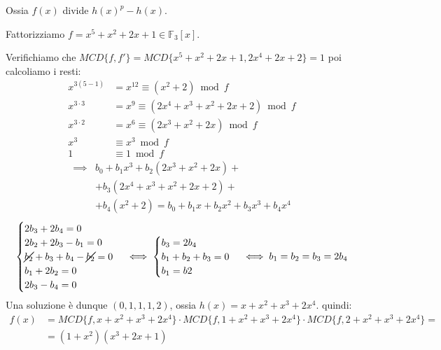 \documentclass[../main.tex]{subfiles}
\begin{document}
Ossia $f(x)$ divide $h(x)^p - h(x)$.
\begin{example}
    Fattorizziamo $f = x^5 + x^2 + 2x + 1 \in \mathbb{F}_3[x]$.

    Verifichiamo che $MCD\{f, f'\} = MCD\{ x^5 + x^2 + 2x + 1, 2x^4 + 2x + 2\} = 1$ poi calcoliamo i resti:
    \begin{align*}
        x^{3(5-1)}    & = x^{12} \equiv (x^2 + 2) \bmod f                \\
        x^{3\cdot3}   & = x^9 \equiv (2x^4 + x^3 + x^2 + 2x + 2) \bmod f \\
        x^{3 \cdot 2} & = x^6 \equiv (2x^3 + x^2 + 2x) \bmod f           \\
        x^3           & \equiv x^3 \bmod f                               \\
        1             & \equiv 1 \bmod f
    \end{align*}
    \begin{align*}
        \implies & b_0 + b_1 x^3 + b_2(2x^3 + x^2 + 2x) +                    \\
                 & + b_3 (2x^4 + x^3 + x^2 + 2x + 2) +                       \\
                 & + b_4(x^2 + 2) = b_0 + b_1 x + b_2x^2 + b_3 x^3 + b_4 x^4
    \end{align*}
    \begin{equation*}
        \begin{cases}
            2 b_3 + 2 b_4 = 0                           \\
            2 b_2 + 2 b_3 - b_1 = 0                     \\
            \cancel{b_2} + b_3 + b_4 - \cancel{b_2} = 0 \\
            b_1 + 2 b_2 = 0                             \\
            2 b_3 - b_4 = 0
        \end{cases}
        \iff
        \begin{cases}
            b_3 = 2 b_4         \\
            b_1 + b_2 + b_3 = 0 \\
            b_1 = b2
        \end{cases}
        \iff
        b_1 = b_2 = b_3 = 2 b_4
    \end{equation*}
    Una soluzione è dunque $(0, 1, 1, 1, 2)$, ossia $h(x) =x + x^2 + x^3 +2 x^4$. quindi:
    \begin{align*}
        f(x) & = MCD\{f, x + x^2 + x^3 +2 x^4\} \cdot MCD\{f, 1 + x^2 + x^3 +2 x^4\} \cdot MCD\{f, 2 + x^2 + x^3 + 2x^4\} = \\
             & = (1 + x^2)(x^3 + 2x + 1)
    \end{align*}
\end{example}
\end{document}
